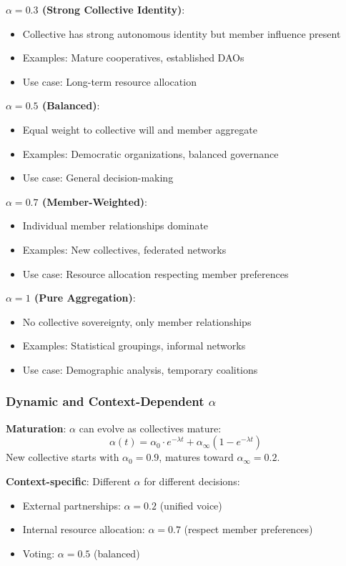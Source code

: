 \documentclass[11pt,a4paper]{article}
\theoremstyle{definition}
\theoremstyle{remark}
\begin{document}
\textbf{$\alpha = 0.3$ (Strong Collective Identity)}:
\begin{itemize}
\item Collective has strong autonomous identity but member influence present
\item Examples: Mature cooperatives, established DAOs
\item Use case: Long-term resource allocation
\end{itemize}

\textbf{$\alpha = 0.5$ (Balanced)}:
\begin{itemize}
\item Equal weight to collective will and member aggregate
\item Examples: Democratic organizations, balanced governance
\item Use case: General decision-making
\end{itemize}

\textbf{$\alpha = 0.7$ (Member-Weighted)}:
\begin{itemize}
\item Individual member relationships dominate
\item Examples: New collectives, federated networks
\item Use case: Resource allocation respecting member preferences
\end{itemize}

\textbf{$\alpha = 1$ (Pure Aggregation)}:
\begin{itemize}
\item No collective sovereignty, only member relationships
\item Examples: Statistical groupings, informal networks
\item Use case: Demographic analysis, temporary coalitions
\end{itemize}

\subsubsection{Dynamic and Context-Dependent $\alpha$}

\textbf{Maturation}: $\alpha$ can evolve as collectives mature:
\[ \alpha(t) = \alpha_0 \cdot e^{-\lambda t} + \alpha_{\infty}(1 - e^{-\lambda t}) \]
New collective starts with $\alpha_0 = 0.9$, matures toward $\alpha_{\infty} = 0.2$.

\textbf{Context-specific}: Different $\alpha$ for different decisions:
\begin{itemize}
\item External partnerships: $\alpha = 0.2$ (unified voice)
\item Internal resource allocation: $\alpha = 0.7$ (respect member preferences)
\item Voting: $\alpha = 0.5$ (balanced)
\end{itemize}
\end{document}
